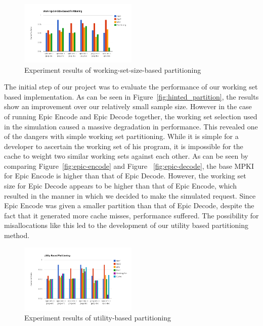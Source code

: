\documentclass{acm_proc_article-sp}
\begin{document}
\begin{figure}
  \includegraphics[width=0.5\textwidth]{figs/work_set_size_hit_ratio.png}
  \caption{Experiment results of working-set-size-based partitioning}
  \label{fig:work_set_results}
\end{figure}

The initial step of our project was to evaluate the performance of our working set based implementation. As can be seen in Figure~\ref{fig:hinted_partition}, the results show an improvement over our relatively small sample size. However in the case of running Epic Encode and Epic Decode together, the working set selection used in the simulation caused a 
massive degradation in performance. This revealed one of the dangers with simple working set partitioning. While it is simple for a developer to ascertain the working set of his program, it is impossible for the cache to weight two similar working sets against each other. As can be seen by comparing  Figure~\ref{fig:epic-encode} and Figure ~\ref{fig:epic-decode}, the base MPKI for Epic Encode is higher than that of Epic Decode. However, the working set size for Epic Decode appears to be higher than that of Epic Encode, which resulted in the manner in which we decided to make the simulated request. Since Epic Encode was given a smaller partition than that of Epic Decode, despite the fact that it generated more cache misses, performance suffered. The possibility for misallocations like this led to the development of our utility based partitioning method.

\begin{figure}
  \includegraphics[width=0.5\textwidth]{figs/utility_hit_ratio.png}
  \caption{Experiment results of utility-based partitioning}
  \label{fig:utility_results}
\end{figure}
\end{document}
